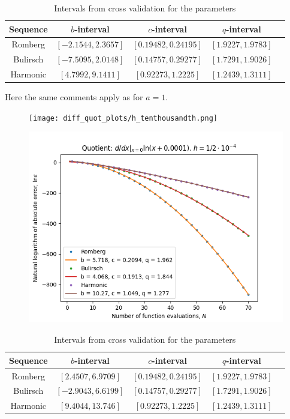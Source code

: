 \begin{table}[H]
    \centering
    \begin{tabular}{c|c||c|c|c}
Sequence & \(b\)-interval & \(c\)-interval & \(q\)-interval\\\hline\hline
Romberg &\([-2.1544, 2.3657]\) & \([0.19482, 0.24195]\) & \([1.9227, 1.9783]\)\\
Bulirsch & \([-7.5095, 2.0148]\) & \([0.14757, 0.29277]\) & \([1.7291, 1.9026]\)\\
Harmonic & \([4.7992, 9.1411]\) & \([0.92273, 1.2225]\) & \([1.2439, 1.3111]\)\\
    \end{tabular}
    \caption{Intervals from cross validation for the parameters}
    \label{tab:my_label}
\end{table}

Here the same comments apply as for \(a = 1\).

\begin{figure}[H]
\centering
\begin{minipage}{0.45\textwidth}
\centering
\texttt{[image: diff\_quot\_plots/h\_tenthousandth.png]}
\end{minipage}
\begin{minipage}{0.45\textwidth}
\centering
\includegraphics[scale=0.45]{diff_quot_plots/h_tenthousandth_hp_trend.png}
\end{minipage}
\end{figure}

\begin{table}[H]
    \centering
    \begin{tabular}{c|c||c|c|c}
Sequence & \(b\)-interval & \(c\)-interval & \(q\)-interval\\\hline\hline
Romberg &\([2.4507, 6.9709]\) & \([0.19482, 0.24195]\) & \([1.9227, 1.9783]\)\\
Bulirsch & \([-2.9043, 6.6199]\) & \([0.14757, 0.29277]\) & \([1.7291, 1.9026]\)\\
Harmonic & \([9.4044, 13.746]\) & \([0.92273, 1.2225]\) & \([1.2439, 1.3111]\)\\
    \end{tabular}
    \caption{Intervals from cross validation for the parameters}
    \label{tab:my_label}
\end{table}

